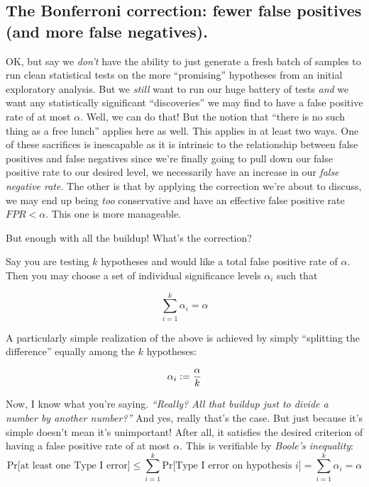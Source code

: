 \documentclass[../main/main.tex]{subfiles}
\begin{document}
\subsection{The Bonferroni correction: fewer false positives (and more false negatives).}

OK, but say we \emph{don't} have the ability to just
generate a fresh batch of samples to run clean statistical
tests
on the more ``promising'' hypotheses from an initial
exploratory analysis.
But we \emph{still} want to run our huge battery of tests
\emph{and} we want any statistically significant ``discoveries''
we may find to have a false positive rate of at most \(\alpha\).
Well, we can do that! But the notion that 
``there is no such thing as a free lunch'' applies here as well.
This applies in at least two ways.
One of these sacrifices is inescapable as it is intrinsic to the relationship
between false positives and false negatives \textemdash{}
since we're finally going to pull down our false positive rate
to our desired level, we necessarily have an increase in
our \emph{false negative rate}.
The other is that by applying the correction we're about
to discuss, we may end up being \emph{too} conservative
and have an effective false positive rate \(FPR < \alpha\).
This one is more manageable.\par
But enough with all the buildup! What's the correction?\par

Say you are testing \(k\) hypotheses and would like a total
false positive rate of \(\alpha\). Then you may choose
a set of individual significance levels \(\alpha_i\) such that

\[\sum_{i = 1}^{k} \alpha_i = \alpha \]

A particularly simple realization of the above is achieved
by simply ``splitting the difference'' equally among the
\(k\) hypotheses:

\[ \alpha_i := \frac{\alpha}{k} \]

Now, I know what you're saying.
\textit{``Really? All that buildup just to divide 
a number by another number?''}
And yes, really that's the case. But just because it's
simple doesn't mean it's unimportant! 
After all, it satisfies the desired criterion of having a
false positive rate of at most \(\alpha\). This is
verifiable by \emph{Boole's inequality}:
\begin{equation}
   \text{Pr[at least one Type I error]} \leq 
   \sum_{i=1}^{k}\text{Pr[Type I error on hypothesis }i\text{]} 
  = \sum_{i=1}^{k}\alpha_i
  = \alpha
\label{equation:bonferri-proof-loose}
\end{equation}
\end{document}
